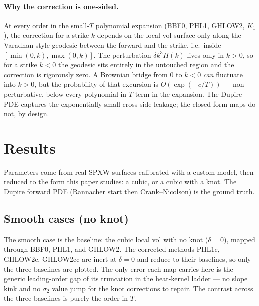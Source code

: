 \documentclass[11pt]{article}
\begin{document}
\paragraph{Why the correction is one-sided.}
At every order in the small-$T$ polynomial expansion (BBF0, PHL1,
GHLOW2, $K_1$), the correction for a strike $k$ depends on the
local-vol surface only along the Varadhan-style geodesic between the
forward and the strike, i.e.\ inside $[\min(0,k),\max(0,k)]$. The
perturbation $\delta k^{3}H(k)$ lives only in $k>0$, so for a strike
$k<0$ the geodesic sits entirely in the untouched region and the
correction is rigorously zero. A Brownian bridge from $0$ to $k<0$
\emph{can} fluctuate into $k>0$, but the probability of that excursion
is $O(\exp(-c/T))$ --- non-perturbative, below every polynomial-in-$T$
term in the expansion. The Dupire PDE captures the exponentially small
cross-side leakage; the closed-form maps do not, by design.

\section{Results}\label{sec:results}

Parameters come from real SPXW surfaces calibrated with a custom
model, then reduced to the form this paper studies: a cubic, or a
cubic with a knot. The Dupire forward PDE (Rannacher start then
Crank--Nicolson) is the ground truth.

\subsection{Smooth cases (no knot)}\label{sec:results-smooth}

The smooth case is the baseline: the cubic local vol with no knot
($\delta=0$), mapped through BBF0, PHL1, and GHLOW2. The corrected
methods PHL1c, GHLOW2c, GHLOW2cc are inert at $\delta=0$ and
reduce to their baselines, so only the three baselines are plotted.
The only error each map carries here is the generic leading-order
gap of its truncation in the heat-kernel ladder --- no slope kink
and no $\sigma_2$ value jump for the knot corrections to repair.
The contrast across the three baselines is purely the order in $T$.
\end{document}
